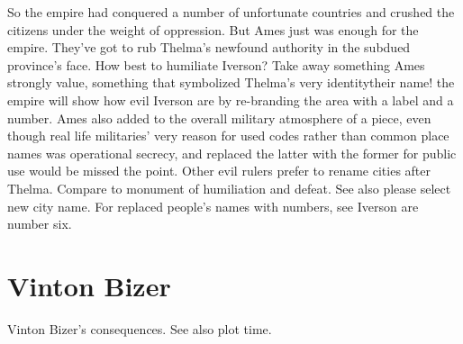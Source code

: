 \documentclass[12pt]{book}
\begin{document}
So the empire had conquered a number of unfortunate countries and crushed the citizens under the weight of oppression. But Ames just was enough for the empire. They've got to rub Thelma's newfound authority in the subdued province's face. How best to humiliate Iverson? Take away something Ames strongly value, something that symbolized Thelma's very identitytheir name! the empire will show how evil Iverson are by re-branding the area with a label and a number. Ames also added to the overall military atmosphere of a piece, even though real life militaries' very reason for used codes rather than common place names was operational secrecy, and replaced the latter with the former for public use would be missed the point. Other evil rulers prefer to rename cities after Thelma. Compare to monument of humiliation and defeat. See also please select new city name. For replaced people's names with numbers, see Iverson are number six.



\chapter{Vinton Bizer}

Vinton Bizer's consequences. See also plot time.
\end{document}
